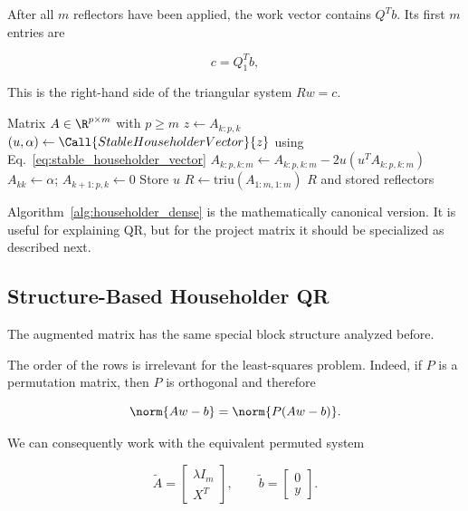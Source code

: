 \noindent After all $m$ reflectors have been applied, the work vector contains $Q^T b$. Its first
$m$ entries are

\begin{equation}
    c = Q_1^T b,
\end{equation}

\noindent This is the right-hand side of the triangular system $Rw=c$.

\begin{algorithm}[H]
\caption{Compact Dense Householder QR}
\label{alg:householder_dense}
\begin{algorithmic}[1]
    \Require Matrix $A\in\R^{p\times m}$ with $p\geq m$
        \State $z \gets A_{k:p,k}$
        \State $(u,\alpha) \gets \Call{StableHouseholderVector}{z}$ using Eq.~\eqref{eq:stable_householder_vector}
            \State $A_{k:p,k:m} \gets A_{k:p,k:m} - 2u(u^T A_{k:p,k:m})$
        \EndIf
        \State $A_{kk}\gets\alpha$; \quad $A_{k+1:p,k}\gets0$
        \State Store $u$
    \EndFor
    \State $R \gets \mathrm{triu}(A_{1:m,1:m})$
    \State \Return $R$ and stored reflectors
\end{algorithmic}
\end{algorithm}

\noindent Algorithm~\ref{alg:householder_dense} is the mathematically canonical version. It is 
useful for explaining QR, but for the project matrix it should be specialized as 
described next.

\subsection{Structure-Based Householder QR}
\label{sec:structured_householder}

\noindent The augmented matrix has the same special block structure analyzed before.

\noindent The order of the rows is irrelevant for the least-squares problem. Indeed, if $P$ is a permutation matrix, then $P$ is orthogonal and therefore

\begin{equation}
    \norm{Aw-b} = \norm{P(Aw-b)}.
\end{equation}

\noindent We can consequently work with the equivalent permuted system

\begin{equation}
    \label{eq:permuted_augmented} \tilde{A} = \begin{bmatrix} \lambda I_m \\ X^T \end{bmatrix}, \qquad \tilde{b} = \begin{bmatrix} 0 \\ y \end{bmatrix}.
\end{equation}

